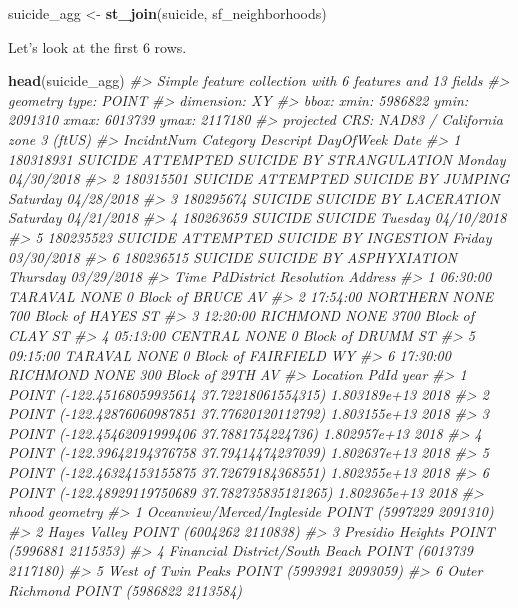\documentclass[
  12pt,
]{book}
\newenvironment{Shaded}{\begin{snugshade}}{\end{snugshade}}
\newcommand{\CommentTok}[1]{\textcolor[rgb]{0.56,0.35,0.01}{\textit{#1}}}
\newcommand{\KeywordTok}[1]{\textcolor[rgb]{0.13,0.29,0.53}{\textbf{#1}}}
\newcommand{\NormalTok}[1]{#1}
\newcommand{\StringTok}[1]{\textcolor[rgb]{0.31,0.60,0.02}{#1}}
\begin{document}
\begin{Shaded}
\begin{Highlighting}[]
\NormalTok{suicide\_agg <{-}}\StringTok{ }\KeywordTok{st\_join}\NormalTok{(suicide, sf\_neighborhoods)}
\end{Highlighting}
\end{Shaded}

Let's look at the first 6 rows.

\begin{Shaded}
\begin{Highlighting}[]
\KeywordTok{head}\NormalTok{(suicide\_agg)}
\CommentTok{\#> Simple feature collection with 6 features and 13 fields}
\CommentTok{\#> geometry type:  POINT}
\CommentTok{\#> dimension:      XY}
\CommentTok{\#> bbox:           xmin: 5986822 ymin: 2091310 xmax: 6013739 ymax: 2117180}
\CommentTok{\#> projected CRS:  NAD83 / California zone 3 (ftUS)}
\CommentTok{\#>   IncidntNum Category                           Descript DayOfWeek       Date}
\CommentTok{\#> 1  180318931  SUICIDE ATTEMPTED SUICIDE BY STRANGULATION    Monday 04/30/2018}
\CommentTok{\#> 2  180315501  SUICIDE       ATTEMPTED SUICIDE BY JUMPING  Saturday 04/28/2018}
\CommentTok{\#> 3  180295674  SUICIDE              SUICIDE BY LACERATION  Saturday 04/21/2018}
\CommentTok{\#> 4  180263659  SUICIDE                            SUICIDE   Tuesday 04/10/2018}
\CommentTok{\#> 5  180235523  SUICIDE     ATTEMPTED SUICIDE BY INGESTION    Friday 03/30/2018}
\CommentTok{\#> 6  180236515  SUICIDE            SUICIDE BY ASPHYXIATION  Thursday 03/29/2018}
\CommentTok{\#>       Time PdDistrict Resolution                 Address}
\CommentTok{\#> 1 06:30:00    TARAVAL       NONE     0 Block of BRUCE AV}
\CommentTok{\#> 2 17:54:00   NORTHERN       NONE   700 Block of HAYES ST}
\CommentTok{\#> 3 12:20:00   RICHMOND       NONE   3700 Block of CLAY ST}
\CommentTok{\#> 4 05:13:00    CENTRAL       NONE     0 Block of DRUMM ST}
\CommentTok{\#> 5 09:15:00    TARAVAL       NONE 0 Block of FAIRFIELD WY}
\CommentTok{\#> 6 17:30:00   RICHMOND       NONE    300 Block of 29TH AV}
\CommentTok{\#>                                         Location         PdId year}
\CommentTok{\#> 1  POINT ({-}122.45168059935614 37.72218061554315) 1.803189e+13 2018}
\CommentTok{\#> 2  POINT ({-}122.42876060987851 37.77620120112792) 1.803155e+13 2018}
\CommentTok{\#> 3   POINT ({-}122.45462091999406 37.7881754224736) 1.802957e+13 2018}
\CommentTok{\#> 4  POINT ({-}122.39642194376758 37.79414474237039) 1.802637e+13 2018}
\CommentTok{\#> 5  POINT ({-}122.46324153155875 37.72679184368551) 1.802355e+13 2018}
\CommentTok{\#> 6 POINT ({-}122.48929119750689 37.782735835121265) 1.802365e+13 2018}
\CommentTok{\#>                            nhood                geometry}
\CommentTok{\#> 1     Oceanview/Merced/Ingleside POINT (5997229 2091310)}
\CommentTok{\#> 2                   Hayes Valley POINT (6004262 2110838)}
\CommentTok{\#> 3               Presidio Heights POINT (5996881 2115353)}
\CommentTok{\#> 4 Financial District/South Beach POINT (6013739 2117180)}
\CommentTok{\#> 5             West of Twin Peaks POINT (5993921 2093059)}
\CommentTok{\#> 6                 Outer Richmond POINT (5986822 2113584)}
\end{Highlighting}
\end{Shaded}
\end{document}
